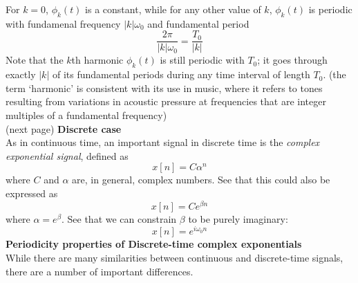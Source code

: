 \documentclass{report}
\begin{document}
For $k=0$, $\phi_k(t)$ is a constant, while for any other value of $k$, $\phi_k(t)$ is periodic with fundamenal 
frequency $|k|\omega_0$ and fundamental period
\begin{equation*}
\frac{2\pi}{|k|\omega_0}=\frac{T_0}{|k|}
\end{equation*}
Note that the $k$th harmonic $\phi_k(t)$ is still periodic with $T_0$; it goes through exactly $|k|$ of its 
fundamental periods during any time interval of length $T_0$. (the term `harmonic' is consistent with its use in
music, where it refers to tones resulting from variations in acoustic pressure at frequencies that are integer
multiples of a fundamental frequency)\\
(next page)\newpage
\noindent\textbf{Discrete case}\\
As in continuous time, an important signal in discrete time is the \textit{complex exponential signal}, defined as
\begin{equation*}
x[n]=C\alpha^n
\end{equation*}
where $C$ and $\alpha$ are, in general, complex numbers. See that this could also be expressed as
\begin{equation*}
x[n]=Ce^{\beta n}
\end{equation*}
where $\alpha=e^\beta$. See that we can constrain $\beta$ to be purely imaginary:
\begin{equation*}
x[n]=e^{i\omega_0n}
\end{equation*}
\textbf{Periodicity properties of Discrete-time complex exponentials}\\
While there are many similarities between continuous and discrete-time signals, there are a number of important
differences. 
\end{document}
